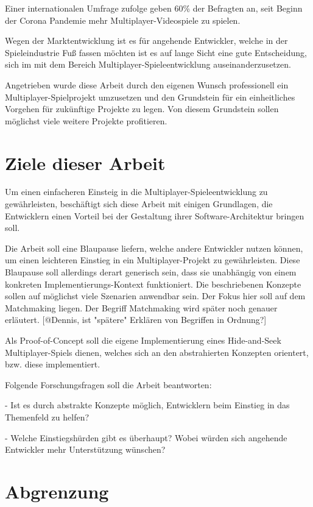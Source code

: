 Einer internationalen Umfrage zufolge geben 60\% der Befragten an, seit Beginn der Corona Pandemie mehr Multiplayer-Videospiele zu spielen. \cite{SimonKucher&Partners.2020}

Wegen der Marktentwicklung ist es für angehende Entwickler, welche in der Spieleindustrie Fuß fassen möchten ist es auf lange Sicht eine gute Entscheidung, sich im mit dem Bereich Multiplayer-Spieleentwicklung auseinanderzusetzen.

Angetrieben wurde diese Arbeit durch den eigenen Wunsch professionell ein Multiplayer-Spielprojekt umzusetzen und den Grundstein für ein einheitliches Vorgehen für zukünftige Projekte zu legen. Von diesem Grundstein sollen möglichst viele weitere Projekte profitieren. 

\section{Ziele dieser Arbeit}

Um einen einfacheren Einsteig in die Multiplayer-Spieleentwicklung zu gewährleisten, beschäftigt sich diese Arbeit mit einigen Grundlagen, die Entwicklern einen Vorteil bei der Gestaltung ihrer Software-Architektur bringen soll.

Die Arbeit soll eine Blaupause liefern, welche andere Entwickler nutzen können, um einen leichteren Einstieg in ein Multiplayer-Projekt zu gewährleisten. Diese Blaupause soll allerdings derart generisch sein, dass sie unabhängig von einem konkreten Implementierungs-Kontext funktioniert. Die beschriebenen Konzepte sollen auf möglichst viele Szenarien anwendbar sein. Der Fokus hier soll auf dem Matchmaking liegen. Der Begriff Matchmaking wird später noch genauer erläutert. [@Dennis, ist "spätere" Erklären von Begriffen in Ordnung?]

Als Proof-of-Concept soll die eigene Implementierung eines Hide-and-Seek Multiplayer-Spiels dienen, welches sich an den abstrahierten Konzepten orientert, bzw. diese implementiert.

Folgende Forschungsfragen soll die Arbeit beantworten:

- Ist es durch abstrakte Konzepte möglich, Entwicklern beim Einstieg in das Themenfeld zu helfen? 

- Welche Einstiegshürden gibt es überhaupt? Wobei würden sich angehende Entwickler mehr Unterstützung wünschen?

\section{Abgrenzung}

